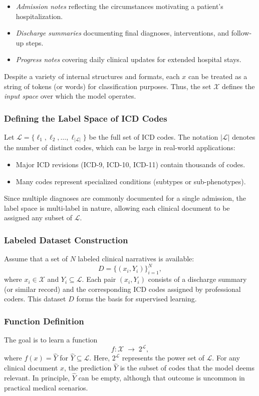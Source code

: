\begin{itemize}
    \item \emph{Admission notes} reflecting the circumstances motivating a patient's hospitalization.
    \item \emph{Discharge summaries} documenting final diagnoses, interventions, and follow-up steps.
    \item \emph{Progress notes} covering daily clinical updates for extended hospital stays.
\end{itemize}

Despite a variety of internal structures and formats, each \(x\) can be treated as a string of tokens (or words) for classification purposes. Thus, the set \(\mathcal{X}\) defines the \emph{input space} over which the model operates.

\subsubsection{Defining the Label Space of ICD Codes}
Let \(\mathcal{L} = \{\ell_1, \ell_2, \dots, \ell_{|\mathcal{L}|}\}\) be the full set of ICD codes. The notation \(|\mathcal{L}|\) denotes the number of distinct codes, which can be large in real-world applications:

\begin{itemize}
    \item Major ICD revisions (ICD-9, ICD-10, ICD-11) contain thousands of codes.
    \item Many codes represent specialized conditions (subtypes or sub-phenotypes).
\end{itemize}

Since multiple diagnoses are commonly documented for a single admission, the label space is multi-label in nature, allowing each clinical document to be assigned any subset of \(\mathcal{L}\).

\subsubsection{Labeled Dataset Construction}
Assume that a set of \(N\) labeled clinical narratives is available:
\[
D = \{ (x_i, Y_i)\}_{i=1}^N,
\]
where \(x_i \in \mathcal{X}\) and \(Y_i \subseteq \mathcal{L}\). Each pair \((x_i, Y_i)\) consists of a discharge summary (or similar record) and the corresponding ICD codes assigned by professional coders. This dataset \(D\) forms the basis for supervised learning.

\subsubsection{Function Definition}
The goal is to learn a function
\begin{equation}
f: \mathcal{X} \;\longrightarrow\; 2^{\mathcal{L}},
\label{eq:p1:fundefinition}
\end{equation}
where \(f(x) = \hat{Y}\) for \(\hat{Y} \subseteq \mathcal{L}\). Here, \(2^{\mathcal{L}}\) represents the power set of \(\mathcal{L}\). For any clinical document \(x\), the prediction \(\hat{Y}\) is the subset of codes that the model deems relevant. In principle, \(\hat{Y}\) can be empty, although that outcome is uncommon in practical medical scenarios.

